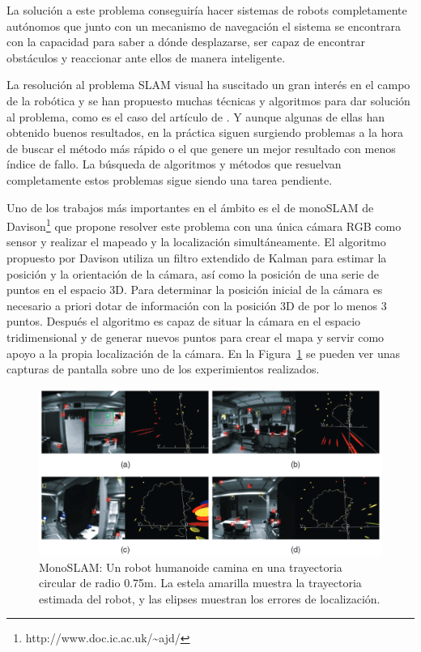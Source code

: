 La solución a este problema conseguiría hacer sistemas de robots completamente autónomos que junto con un mecanismo de navegación el sistema se encontrara con la capacidad para saber a dónde desplazarse, ser capaz de encontrar obstáculos y reaccionar ante ellos de manera inteligente.

La resolución al problema SLAM visual ha suscitado un gran interés en el campo de la robótica y se han propuesto muchas técnicas y algoritmos para dar solución al problema, como es el caso del artículo de \cite{Reference1}. Y aunque algunas de ellas han obtenido buenos resultados, en la práctica siguen surgiendo problemas a la hora de buscar el método más rápido o el que genere un mejor resultado con menos índice de fallo. La búsqueda de algoritmos y métodos que resuelvan completamente estos problemas sigue siendo una tarea pendiente.

Uno de los trabajos más importantes en el ámbito es el de monoSLAM de Davison\footnote{http://www.doc.ic.ac.uk/\textasciitilde ajd/} \parencite{Reference5} que propone resolver este problema con una única cámara RGB como sensor y realizar el mapeado y la localización simultáneamente. El algoritmo propuesto por Davison utiliza un filtro extendido de Kalman para estimar la posición y la orientación de la cámara, así como la posición de una serie de puntos en el espacio 3D. Para determinar la posición inicial de la cámara es necesario a priori dotar de información con la posición 3D de por lo menos 3 puntos. Después el algoritmo es capaz de situar la cámara en el espacio tridimensional y de generar nuevos puntos para crear el mapa y servir como apoyo a la propia localización de la cámara. En la Figura~\ref{fig:Monoslam} se pueden ver unas capturas de pantalla sobre uno de los experimientos realizados.

\begin{figure}[th]
\centering
\includegraphics[scale=0.35]{Figures/monoslam.png}
\decoRule
\caption[MonoSLAM]{MonoSLAM: Un robot humanoide camina en una trayectoria circular de radio 0.75m. La estela amarilla muestra la trayectoria estimada del robot, y las elipses muestran los errores de localización.}
\label{fig:Monoslam}
\end{figure}

